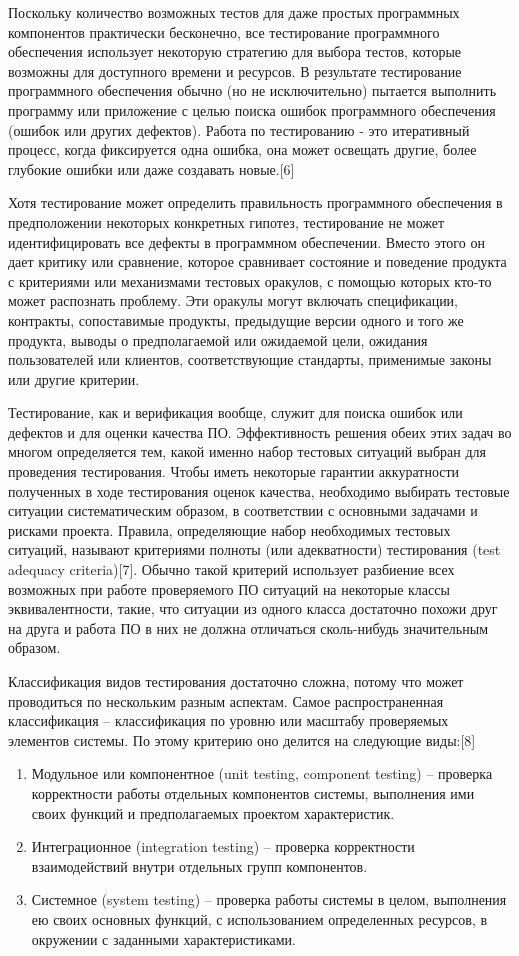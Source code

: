 Поскольку количество возможных тестов для даже простых программных компонентов практически бесконечно, все тестирование программного обеспечения использует некоторую стратегию для выбора тестов, которые возможны для доступного времени и ресурсов. В результате тестирование программного обеспечения обычно (но не исключительно) пытается выполнить программу или приложение с целью поиска ошибок программного обеспечения (ошибок или других дефектов). Работа по тестированию - это итеративный процесс, когда фиксируется одна ошибка, она может освещать другие, более глубокие ошибки или даже создавать новые.[6]

Хотя тестирование может определить правильность программного обеспечения в предположении некоторых конкретных гипотез, тестирование не может идентифицировать все дефекты в программном обеспечении. Вместо этого он дает критику или сравнение, которое сравнивает состояние и поведение продукта с критериями или механизмами тестовых оракулов, с помощью которых кто-то может распознать проблему. Эти оракулы могут включать спецификации, контракты, сопоставимые продукты, предыдущие версии одного и того же продукта, выводы о предполагаемой или ожидаемой цели, ожидания пользователей или клиентов, соответствующие стандарты, применимые законы или другие критерии.


Тестирование, как и верификация вообще, служит для поиска ошибок или дефектов и для оценки качества ПО. Эффективность решения обеих этих задач во многом определяется тем, какой именно набор тестовых ситуаций выбран для проведения тестирования. Чтобы иметь некоторые гарантии аккуратности полученных в ходе тестирования оценок качества, необходимо выбирать тестовые ситуации систематическим образом, в соответствии с основными задачами и рисками проекта. Правила, определяющие набор необходимых тестовых ситуаций, называют критериями полноты (или адекватности) тестирования (test adequacy criteria)[7]. Обычно такой критерий использует разбиение всех возможных при работе проверяемого ПО ситуаций на некоторые классы эквивалентности, такие, что ситуации из одного класса достаточно похожи друг на друга и работа ПО в них не должна отличаться сколь-нибудь значительным образом.

Классификация видов тестирования достаточно сложна, потому что может проводиться по нескольким разным аспектам.  Самое распространенная классификация – классификация по уровню или масштабу проверяемых элементов системы. По этому критерию оно делится на следующие виды:[8]


\begin{enumerate}[label=\arabic*)]
	\item Модульное или компонентное (unit testing, component testing) – проверка корректности работы отдельных компонентов системы, выполнения ими своих функций и предполагаемых проектом характеристик.
	\item Интеграционное (integration testing) – проверка корректности взаимодействий внутри отдельных групп компонентов.
	\item Системное (system testing) – проверка работы системы в целом, выполнения ею своих основных функций, с использованием определенных ресурсов, в окружении с заданными характеристиками.
\end{enumerate}

